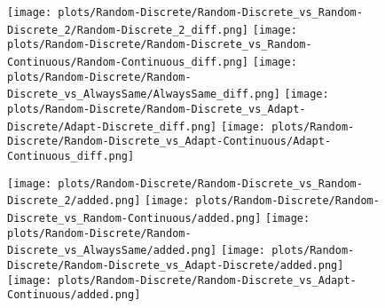 \documentclass{article}
\begin{document}
\begin{itemize}
\begin{figure}[!h]
	\begin{minipage}[c]{0.80\textwidth}
		\texttt{[image: plots/Random-Discrete/Random-Discrete\_vs\_Random-Discrete\_2/Random-Discrete\_2\_diff.png]}\hfill
		\texttt{[image: plots/Random-Discrete/Random-Discrete\_vs\_Random-Continuous/Random-Continuous\_diff.png]}\hfill
		\texttt{[image: plots/Random-Discrete/Random-Discrete\_vs\_AlwaysSame/AlwaysSame\_diff.png]}\hfill
		\texttt{[image: plots/Random-Discrete/Random-Discrete\_vs\_Adapt-Discrete/Adapt-Discrete\_diff.png]}\hfill
		\texttt{[image: plots/Random-Discrete/Random-Discrete\_vs\_Adapt-Continuous/Adapt-Continuous\_diff.png]}\hfill
\end{minipage}
\end{figure}
\begin{figure}[!h]
	\centering
	\begin{minipage}[c]{0.1\textwidth}
		\raggedleft
	\end{minipage}
	\begin{minipage}[c]{0.80\textwidth}
		\texttt{[image: plots/Random-Discrete/Random-Discrete\_vs\_Random-Discrete\_2/added.png]}\hfill
		\texttt{[image: plots/Random-Discrete/Random-Discrete\_vs\_Random-Continuous/added.png]}\hfill
		\texttt{[image: plots/Random-Discrete/Random-Discrete\_vs\_AlwaysSame/added.png]}\hfill
		\texttt{[image: plots/Random-Discrete/Random-Discrete\_vs\_Adapt-Discrete/added.png]}\hfill 
		\texttt{[image: plots/Random-Discrete/Random-Discrete\_vs\_Adapt-Continuous/added.png]}\hfill
	\end{minipage}
\end{figure}


\end{itemize}
\end{document}
